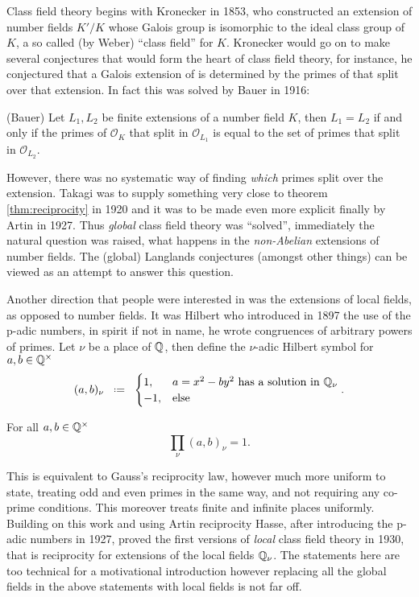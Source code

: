 Class field theory begins with Kronecker in 1853, who constructed an extension of number fields \(K'/K\) whose Galois group is isomorphic to the ideal class group of \(K\), a so called (by Weber) ``class field'' for \(K\). Kronecker would go on to make several conjectures that would form the heart of class field theory, for instance, he conjectured that a Galois extension of \Q is determined by the primes of \Z that split over that extension. In fact this was solved by Bauer in 1916:
\begin{Theorem}(Bauer)
	Let \(L_1, L_2\) be finite extensions of a number field \(K\), then \(L_1 = L_2\) if and only if the primes of \(\mathcal{O}_K\) that split in \(\mathcal{O}_{L_1}\) is equal to the set of primes that split in \(\mathcal{O}_{L_2}\).
\end{Theorem}
However, there was no systematic way of finding \textit{which} primes split over the extension. Takagi was to supply something very close to theorem \ref{thm:reciprocity} in 1920 and it was to be made even more explicit finally by Artin in 1927. Thus \textit{global} class field theory was ``solved'', immediately the natural question was raised, what happens in the \textit{non-Abelian} extensions of number fields. The (global) Langlands conjectures (amongst other things) can be viewed as an attempt to answer this question. 

Another direction that people were interested in was the extensions of local fields, as opposed to number fields. It was Hilbert who introduced in 1897 the use of the p-adic numbers, in spirit if not in name, he wrote congruences of arbitrary powers of primes. Let \(\nu\) be a place of \(\Q\), then define the \(\nu\)-adic Hilbert symbol for \(a,b\in \Q^\times\)
\[(a,b)_\nu \defeq \begin{cases}
	1, & a= x^2-by^2 \text{ has a solution in }\Q_\nu\\
	-1, &\text{else}
\end{cases} .\]
\begin{Theorem}
	For all \(	a,b\in \Q^\times\) 
	\[\prod_\nu (a,b)_\nu = 1.\]
\end{Theorem}
This is equivalent to Gauss's reciprocity law, however much more uniform to state, treating odd and even primes in the same way, and not requiring any co-prime conditions. This moreover treats finite and infinite places uniformly. Building on this work and using Artin reciprocity Hasse, after introducing the p-adic numbers in 1927, proved the first versions of \textit{local} class field theory in 1930, that is reciprocity for extensions of the local fields \(\Q_\nu\). The statements here are too technical for a motivational introduction however replacing all the global fields in the above statements with local fields is not far off. 

